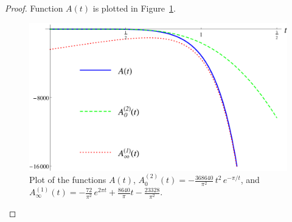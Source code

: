 \begin{proof}
Function $A(t)$ is plotted in Figure~\ref{fig: A}.
\begin{figure}[h!]
\caption{Plot of the functions $A(t)$, $A^{(2)}_0(t)=-\frac{368640}{\pi^2}\,t^2\,e^{-\pi /t}$, and $A^{(1)}_\infty(t)=-\frac{72}{\pi^2}\,e^{2\pi t}+\frac{8640}{\pi}t-\frac{23328}{\pi^2}$.\label{fig: A}}
  \centering
\includegraphics[width=300 pt]{graphics/e8plot_A.pdf}
\end{figure}


\end{proof}

